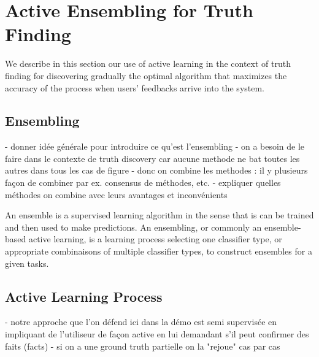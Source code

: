 \section{Active Ensembling for Truth Finding}
We describe in this section our use of active learning in the context of truth finding
for discovering gradually the optimal algorithm that maximizes the accuracy of the process
when users' feedbacks arrive into the system.
\subsection{Ensembling }
- donner idée générale pour introduire  ce qu'est l'ensembling
- on a besoin de le faire dans le contexte de truth discovery car aucune methode ne bat toutes les autres dans tous les cas de figure
- donc on combine les methodes : il y plusieurs façon de combiner par ex. consensus de méthodes, etc.
- expliquer quelles méthodes on combine avec leurs avantages et inconvénients

An ensemble is a supervised learning algorithm in the sense that is can be trained and then used to make predictions.
An ensembling, or  commonly an ensemble-based active learning, is a learning process selecting one classifier type, or appropriate combinaisons 
of multiple classifier types, to construct ensembles for a given tasks.

\subsection{Active Learning Process}
- notre approche que l'on défend ici dans la démo est  semi supervisée en impliquant de l'utiliseur de façon active
en lui demandant s'il peut confirmer des faits (facts)
- si on a une ground truth partielle on la "rejoue" cas par cas

